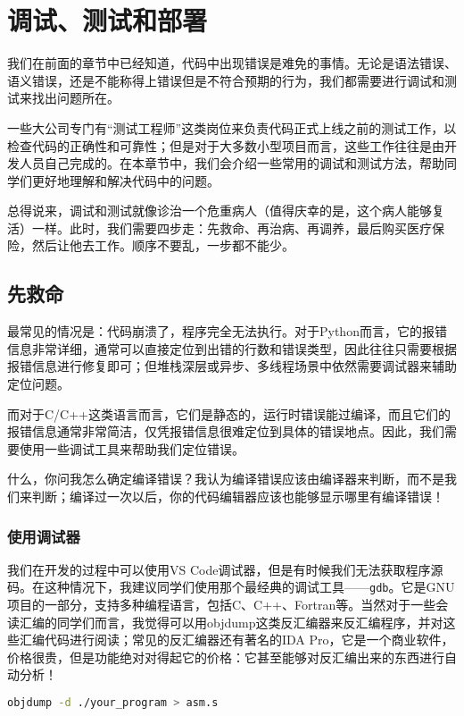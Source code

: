 \chapter{调试、测试和部署}

我们在前面的章节中已经知道，代码中出现错误是难免的事情。无论是语法错误、语义错误，还是不能称得上错误但是不符合预期的行为，我们都需要进行调试和测试来找出问题所在。

一些大公司专门有“测试工程师”这类岗位来负责代码正式上线之前的测试工作，以检查代码的正确性和可靠性；但是对于大多数小型项目而言，这些工作往往是由开发人员自己完成的。在本章节中，我们会介绍一些常用的调试和测试方法，帮助同学们更好地理解和解决代码中的问题。

总得说来，调试和测试就像诊治一个危重病人（值得庆幸的是，这个病人能够复活）一样。此时，我们需要四步走：先救命、再治病、再调养，最后购买医疗保险，然后让他去工作。顺序不要乱，一步都不能少。

\section{先救命}

最常见的情况是：代码崩溃了，程序完全无法执行。对于Python而言，它的报错信息非常详细，通常可以直接定位到出错的行数和错误类型，因此往往只需要根据报错信息进行修复即可；但堆栈深层或异步、多线程场景中依然需要调试器来辅助定位问题。

而对于C/C++这类语言而言，它们是静态的，运行时错误能过编译，而且它们的报错信息通常非常简洁，仅凭报错信息很难定位到具体的错误地点。因此，我们需要使用一些调试工具来帮助我们定位错误。

什么，你问我怎么确定编译错误？我认为编译错误应该由编译器来判断，而不是我们来判断；编译过一次以后，你的代码编辑器应该也能够显示哪里有编译错误！

\subsection{使用调试器}

我们在开发的过程中可以使用VS Code调试器，但是有时候我们无法获取程序源码。在这种情况下，我建议同学们使用那个最经典的调试工具——\texttt{gdb}。它是GNU项目的一部分，支持多种编程语言，包括C、C++、Fortran等。当然对于一些会读汇编的同学们而言，我觉得可以用objdump这类反汇编器来反汇编程序，并对这些汇编代码进行阅读；常见的反汇编器还有著名的IDA Pro，它是一个商业软件，价格很贵，但是功能绝对对得起它的价格：它甚至能够对反汇编出来的东西进行自动分析！
\begin{lstlisting}[language=bash]
    objdump -d ./your_program > asm.s
\end{lstlisting}

